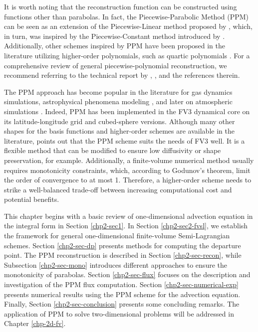 It is worth noting that the reconstruction function can be constructed using functions other than parabolas.
 In fact, the Piecewise-Parabolic Method (PPM) can be seen as an
extension of the Piecewise-Linear method proposed by \citet{vanleer:1977}, which,
in turn, was inspired by the Piecewise-Constant method introduced by \citet{godunov:1959}. 
Additionally, other schemes inspired by PPM have been proposed in the literature utilizing
higher-order polynomials, such as quartic polynomials \citep{white:2008}. For a
comprehensive review of general piecewise-polynomial reconstruction, we recommend
referring to the technical report by \citet{engwirda:2016}, \citet{lauritzen:2011}, and the
references therein.

The PPM approach has become popular in the literature for gas dynamics simulations, astrophysical 
phenomena modeling \citep{woodward:1986}, and later on atmospheric simulations \citep{carpenter:1990}. 
Indeed, PPM has been implemented in the FV3 dynamical core on its latitude-longitude grid \citep{lin:2004}
and cubed-sphere \citep{putman:2007} versions.
Although many other shapes for the basis functions and higher-order schemes are available in the literature, 
\citet{harris:2021} points out that the PPM scheme suits the needs of FV3 well. It is a flexible method that
can be modified to ensure low diffusivity or shape preservation, for example.
Additionally, a finite-volume numerical method usually requires monotonicity constraints, which, according 
to Godunov's theorem, limit the order of convergence to at most 1. 
Therefore, a higher-order scheme needs to strike a well-balanced trade-off between increasing computational 
cost and potential benefits.

This chapter begins with a basic review of one-dimensional advection equation in the integral form
in Section \ref{chp2-sec1}. In Section \ref{chp2-sec2-fvsl}, we establish the framework for general
one-dimensional finite-volume Semi-Lagrangian schemes. Section \ref{chp2-sec-dp} presents
methods for computing the departure point. The PPM reconstruction is described in Section \ref{chp2-sec-recon},
while Subsection \ref{chp2-sec-mono} introduces different approaches to ensure the monotonicity of parabolas.
Section \ref{chp2-sec-flux} focuses on the description and investigation of the PPM flux computation.
Section \ref{chp2-sec-numerical-exp}
presents numerical results using the PPM scheme for the advection equation.
Finally, Section \ref{chp2-sec-conclusion} presents some concluding remarks.
The application of PPM to solve two-dimensional problems will be addressed in Chapter \ref{chp-2d-fv}.

